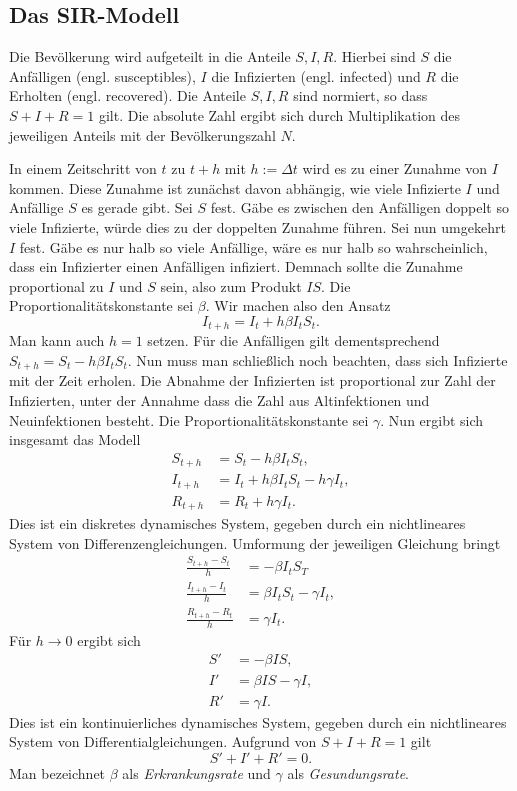\documentclass[a4paper,11pt,fleqn,twocolumn,twoside,dvipdfmx]{scrartcl}
\numberwithin{equation}{section}
\begin{document}
\subsection{Das SIR-Modell}

Die Bevölkerung wird aufgeteilt in die Anteile $S,I,R$. Hierbei sind
$S$ die Anfälligen (engl. susceptibles), $I$ die Infizierten (engl.
infected) und $R$ die Erholten (engl. recovered). Die Anteile
$S,I,R$ sind normiert, so dass $S+I+R=1$ gilt. Die absolute Zahl
ergibt sich durch Multiplikation des jeweiligen Anteils mit der
Bevölkerungszahl $N$.

In einem Zeitschritt von $t$ zu $t+h$ mit $h:=\Delta t$ wird es zu
einer Zunahme von $I$ kommen. Diese Zunahme ist zunächst davon
abhängig, wie
viele Infizierte $I$ und Anfällige $S$ es gerade gibt. Sei
$S$ fest. Gäbe es zwischen den Anfälligen doppelt so viele Infizierte,
würde dies zu der doppelten Zunahme führen. Sei nun umgekehrt $I$
fest. Gäbe es nur halb so viele Anfällige, wäre es nur halb so
wahrscheinlich, dass ein Infizierter einen Anfälligen infiziert.
Demnach sollte die Zunahme proportional zu $I$ und $S$ sein, also
zum Produkt $IS$. Die Proportionalitätskonstante sei $\beta$. Wir machen
also den Ansatz%
\begin{equation}
I_{t+h} = I_t + h\beta I_t S_t.
\end{equation}
Man kann auch $h=1$ setzen. Für die Anfälligen gilt dementsprechend
$S_{t+h}=S_t-h\beta I_t S_t$. Nun muss man schließlich noch beachten,
dass sich Infizierte mit der Zeit erholen. Die Abnahme der Infizierten
ist proportional zur Zahl der Infizierten, unter der Annahme dass
die Zahl aus Altinfektionen und Neuinfektionen besteht. Die
Proportionalitätskonstante sei $\gamma$.
Nun ergibt sich insgesamt das Modell%
\begin{align}
S_{t+h} &= S_t-h\beta I_t S_t,\\
I_{t+h} &= I_t+h\beta I_t S_t-h\gamma I_t,\\
R_{t+h} &= R_t+h\gamma I_t.
\end{align}
Dies ist ein diskretes dynamisches System, gegeben durch ein
nichtlineares System von Differenzengleichungen. Umformung der jeweiligen
Gleichung bringt%
\begin{align}
\frac{S_{t+h}-S_t}{h} &= -\beta I_t S_T\\
\frac{I_{t+h}-I_t}{h} &= \beta I_t S_t-\gamma I_t,\\
\frac{R_{t+h}-R_t}{h} &= \gamma I_t.
\end{align}
Für $h\to 0$ ergibt sich
\begin{align}
\label{eq:SIR-System-S} S' &= -\beta IS,\\
\label{eq:SIR-System-I} I' &= \beta IS-\gamma I,\\
\label{eq:SIR-System-R} R' &= \gamma I.
\end{align}
Dies ist ein kontinuierliches dynamisches System, gegeben durch ein
nichtlineares System von Differentialgleichungen. Aufgrund von
$S+I+R=1$ gilt%
\begin{equation}
S'+I'+R'=0.
\end{equation}
Man bezeichnet $\beta$ als \emph{Erkrankungsrate} und
$\gamma$ als \emph{Gesundungsrate}.
\end{document}
